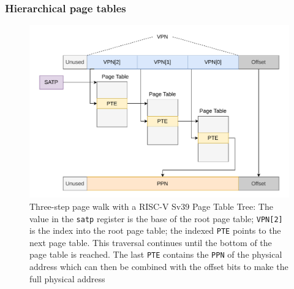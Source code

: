 \subsubsection{Hierarchical page tables}
\begin{figure}[t]
    \centering
    \includegraphics[scale=.8]{figures/VM-Tree.pdf}
    \caption[RISC-V Sv39 3-Level Page Tree]{Three-step page walk with a RISC-V Sv39 Page Table Tree:
        The value in the \texttt{satp} register is the base of the root page table; \texttt{VPN[2]}
        is the index into the root page table; the indexed \texttt{PTE} points to the next page table.
        This traversal continues until the bottom of the page table is reached. The last \texttt{PTE}
        contains the \texttt{PPN} of the physical address which can then be combined with the offset
        bits to make the full physical address}
    \label{fig:fund:pagetree}
\end{figure}


